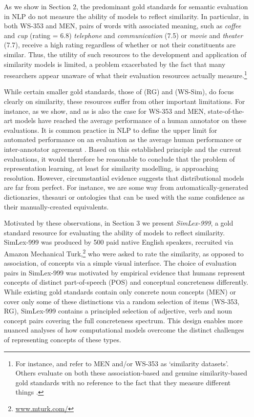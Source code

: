 \documentclass[fullname]{clv2}
\begin{document}
As we show in Section 2, the predominant gold standards for semantic evaluation in NLP do not measure the ability of models to reflect similarity. In particular, in both WS-353 and MEN, pairs of words with associated meaning, such as \emph{coffee} and \emph{cup} (rating = 6.8) \emph{telephone} and \emph{communication} (7.5) or \emph{movie} and \emph{theater} (7.7), receive a high rating regardless of whether or not their constituents are similar. Thus, the utility of such resources to the development and application of similarity models is limited, a problem exacerbated by the fact that many researchers appear unaware of what their evaluation resources actually measure.\footnote{For instance,   and  refer to MEN and/or WS-353 as `similarity datasets'. Others evaluate on both these association-based and genuine similarity-based gold standards with no reference to the fact that they measure different things \cite{medelyan2009mining,li2014obtaining}.} 

While certain smaller gold standards, those of  (RG) and  (WS-Sim), do focus clearly on similarity, these resources suffer from other important limitations. For instance, as we show, and as is also the case for WS-353 and MEN, state-of-the-art models have reached the average performance of a human annotator on these evaluations. It is common practice in NLP to define the upper limit for automated performance on an evaluation as the average human performance or inter-annotator agreement \cite{yong1999case,cunningham2005information,resnik201011}. Based on this established principle and the current evaluations, it would therefore be reasonable to conclude that the problem of representation learning, at least for similarity modelling, is approaching resolution. However, circumstantial evidence suggests that distributional models are far from perfect. For instance, we are some way from automatically-generated dictionaries, thesauri or ontologies that can be used with the same confidence as their manually-created equivalents.   

Motivated by these observations, in Section 3 we present \emph{SimLex-999}, a gold standard resource for evaluating the ability of models to reflect similarity. SimLex-999 was produced by 500 paid native English speakers, recruited via Amazon Mechanical Turk,\footnote{\url{www.mturk.com/}} who were asked to rate the similarity, as opposed to association, of concepts via a simple visual interface. The choice of evaluation pairs in SimLex-999 was motivated by empirical evidence that humans represent concepts of distinct part-of-speech (POS) \cite{gentner1978relational} and conceptual concreteness \cite{hill2013quantitative} differently. While existing gold standards contain only concrete noun concepts (MEN) or cover only some of these distinctions via a random selection of items (WS-353, RG), SimLex-999 contains a principled selection of adjective, verb and noun concept pairs covering the full concreteness spectrum. This design enables more nuanced analyses of how computational models overcome the distinct challenges of representing concepts of these types. 
\end{document}
